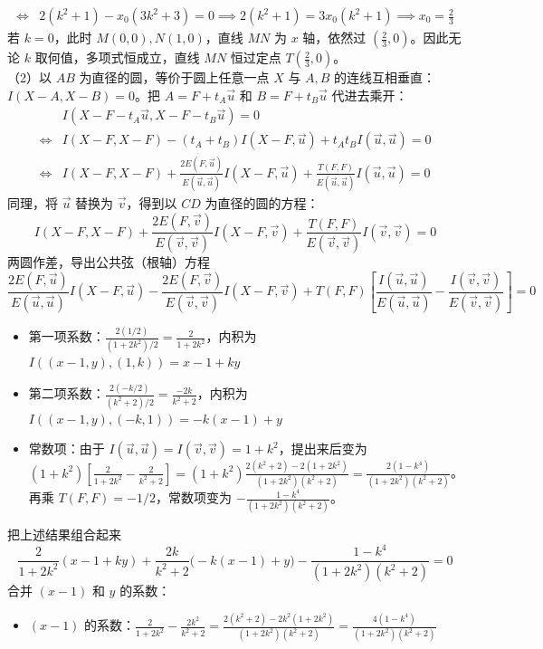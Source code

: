 \begin{solution}
\begin{align*}
\Leftrightarrow & 2(k^2+1) - x_0(3k^2+3) = 0 \implies 2(k^2+1) = 3x_0(k^2+1)\implies x_0 = \frac{2}{3}
\end{align*}
若 $k=0$，此时 $M(0,0), N(1,0)$，直线 $MN$ 为 $x$ 轴，依然过 $(\frac{2}{3},0)$。因此无论 $k$ 取何值，多项式恒成立，直线 $MN$ 恒过定点 $T\left(\frac{2}{3}, 0\right)$。\\
（2）以 $AB$ 为直径的圆，等价于圆上任意一点 $X$ 与 $A, B$ 的连线互相垂直：$I(X-A, X-B) = 0$。把 $A = F+t_A\vec{u}$ 和 $B = F+t_B\vec{u}$ 代进去乘开：
\begin{align*}
&I(X - F - t_A \vec{u}, X - F - t_B \vec{u}) = 0\\
\Leftrightarrow &I(X-F, X-F) - (t_A+t_B) I(X-F, \vec{u}) + t_A t_B I(\vec{u},\vec{u}) = 0\\
\Leftrightarrow &I(X-F, X-F) + \frac{2E(F,\vec{u})}{E(\vec{u},\vec{u})} I(X-F, \vec{u}) + \frac{T(F,F)}{E(\vec{u},\vec{u})} I(\vec{u},\vec{u}) = 0
\end{align*}
同理，将 $\vec{u}$ 替换为 $\vec{v}$，得到以 $CD$ 为直径的圆的方程：
$$I(X-F, X-F) + \frac{2E(F,\vec{v})}{E(\vec{v},\vec{v})} I(X-F, \vec{v}) + \frac{T(F,F)}{E(\vec{v},\vec{v})} I(\vec{v},\vec{v}) = 0$$
两圆作差，导出公共弦（根轴）方程
$$\frac{2E(F,\vec{u})}{E(\vec{u},\vec{u})} I(X-F, \vec{u}) - \frac{2E(F,\vec{v})}{E(\vec{v},\vec{v})} I(X-F, \vec{v}) + T(F,F) \left[ \frac{I(\vec{u},\vec{u})}{E(\vec{u},\vec{u})} - \frac{I(\vec{v},\vec{v})}{E(\vec{v},\vec{v})} \right] = 0$$
\begin{itemize}
\item 第一项系数：$\frac{2(1/2)}{(1+2k^2)/2} = \frac{2}{1+2k^2}$，内积为 $I((x-1,y), (1,k)) = x-1+ky$
\item 第二项系数：$\frac{2(-k/2)}{(k^2+2)/2} = \frac{-2k}{k^2+2}$，内积为 $I((x-1,y), (-k,1)) = -k(x-1)+y$
\item 常数项：由于 $I(\vec{u},\vec{u}) = I(\vec{v},\vec{v}) = 1+k^2$，提出来后变为$(1+k^2) \left[ \frac{2}{1+2k^2} - \frac{2}{k^2+2} \right] = (1+k^2) \frac{2(k^2+2) - 2(1+2k^2)}{(1+2k^2)(k^2+2)} = \frac{2(1-k^4)}{(1+2k^2)(k^2+2)}$。再乘 $T(F,F) = -1/2$，常数项变为 $-\frac{1-k^4}{(1+2k^2)(k^2+2)}$。
\end{itemize}
把上述结果组合起来
$$\frac{2}{1+2k^2}(x-1+ky) + \frac{2k}{k^2+2}\big(-k(x-1)+y\big) - \frac{1-k^4}{(1+2k^2)(k^2+2)} = 0$$合并 $(x-1)$ 和 $y$ 的系数：
\begin{itemize}
\item $(x-1)$ 的系数：$\frac{2}{1+2k^2} - \frac{2k^2}{k^2+2} = \frac{2(k^2+2) - 2k^2(1+2k^2)}{(1+2k^2)(k^2+2)} = \frac{4(1-k^4)}{(1+2k^2)(k^2+2)}$

\end{itemize}
\end{solution}
